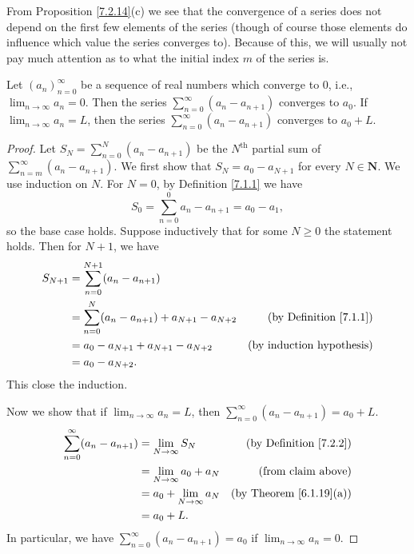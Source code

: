 \begin{note}
    From Proposition \ref{7.2.14}(c) we see that the convergence of a series does not depend on the first few elements of the series
    (though of course those elements do influence which value the series converges to).
    Because of this, we will usually not pay much attention as to what the initial index \(m\) of the series is.
\end{note}

\begin{lemma}\label{7.2.15}
    Let \((a_n)_{n = 0}^\infty\) be a sequence of real numbers which converge to \(0\), i.e., \(\lim_{n \to \infty} a_n = 0\).
    Then the series \(\sum_{n = 0}^\infty (a_n - a_{n + 1})\) converges to \(a_0\).
    If \(\lim_{n \to \infty} a_n = L\), then the series \(\sum_{n = 0}^\infty (a_n - a_{n + 1})\) converges to \(a_0 + L\).
\end{lemma}

\begin{proof}
    Let \(S_N = \sum_{n = 0}^N (a_n - a_{n + 1})\) be the \(N^{\text{th}}\) partial sum of \(\sum_{n = m}^\infty (a_n - a_{n + 1})\).
    We first show that \(S_N = a_0 - a_{N + 1}\) for every \(N \in \mathbf{N}\).
    We use induction on \(N\).
    For \(N = 0\), by Definition \ref{7.1.1} we have
    \[
        S_0 = \sum_{n = 0}^0 a_n - a_{n + 1} = a_0 - a_1,
    \]
    so the base case holds.
    Suppose inductively that for some \(N \geq 0\) the statement holds.
    Then for \(N + 1\), we have
    \begin{align*}
        S_{N + 1} & = \sum_{n = 0}^{N + 1} (a_n - a_{n + 1})                                                        \\
                  & = \sum_{n = 0}^N (a_n - a_{n + 1}) + a_{N + 1} - a_{N + 2} & \text{(by Definition \ref{7.1.1})} \\
                  & = a_0 - a_{N + 1} + a_{N + 1} - a_{N + 2}                  & \text{(by induction hypothesis)}   \\
                  & = a_0 - a_{N + 2}.
    \end{align*}
    This close the induction.

    Now we show that if \(\lim_{n \to \infty} a_n = L\), then \(\sum_{n = 0}^\infty (a_n - a_{n + 1}) = a_0 + L\).
    \begin{align*}
        \sum_{n = 0}^\infty (a_n - a_{n + 1}) & = \lim_{N \to \infty} S_N       & \text{(by Definition \ref{7.2.2})}  \\
                                              & = \lim_{N \to \infty} a_0 + a_N & \text{(from claim above)}           \\
                                              & = a_0 + \lim_{N \to \infty} a_N & \text{(by Theorem \ref{6.1.19}(a))} \\
                                              & = a_0 + L.
    \end{align*}
    In particular, we have \(\sum_{n = 0}^\infty (a_n - a_{n + 1}) = a_0\) if \(\lim_{n \to \infty} a_n = 0\).
\end{proof}

